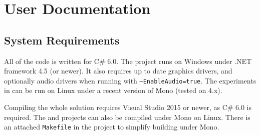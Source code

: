 \chapter{User Documentation}

\section{System Requirements}

All of the code is written for C\# 6.0. The  project runs on Windows under .NET framework 4.5 (or newer). It also requires up to date graphics drivers, and optionally audio drivers when running with \texttt{--EnableAudio=true}. The experiments in  can be run on Linux under a recent version of Mono (tested on 4.x).

Compiling the whole solution requires Visual Studio 2015 or newer, as C\# 6.0 is required. The  and  projects can also be compiled under Mono on Linux. There is an attached \verb|Makefile| in the  project to simplify building under Mono.


